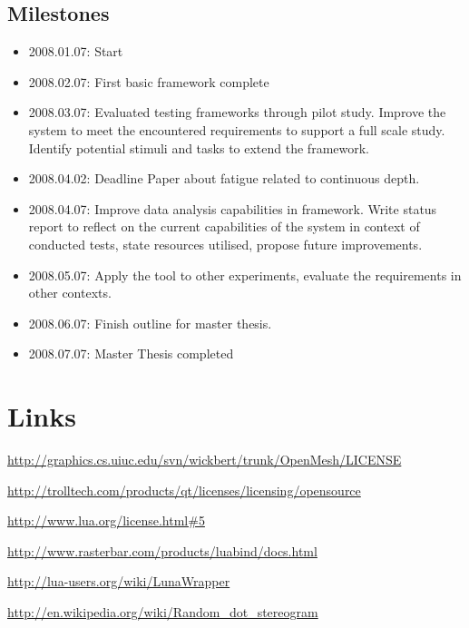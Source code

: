\documentclass[11pt]{scrartcl}
\begin{document}
\begin{multicols}{2}
\section{Milestones}
\begin{itemize}
\item 2008.01.07: Start
\item 2008.02.07: First basic framework complete
\item 2008.03.07: Evaluated testing frameworks through pilot study. Improve the system to meet the encountered requirements to support a full scale study. Identify potential stimuli and tasks to extend the framework.
\item 2008.04.02: Deadline Paper about fatigue related to continuous depth.
\item 2008.04.07: Improve data analysis capabilities in framework. Write status report to reflect on the current capabilities of the system in context of conducted tests, state resources utilised, propose future improvements.
\item 2008.05.07: Apply the tool to other experiments, evaluate the requirements in other contexts.
\item 2008.06.07: Finish outline for master thesis.
\item 2008.07.07: Master Thesis completed
\end{itemize}

\end{multicols}

\appendix

\section{Links}
\url{http://graphics.cs.uiuc.edu/svn/wickbert/trunk/OpenMesh/LICENSE}

\url{http://trolltech.com/products/qt/licenses/licensing/opensource}

\url{http://www.lua.org/license.html#5}

\url{http://www.rasterbar.com/products/luabind/docs.html}

\url{http://lua-users.org/wiki/LunaWrapper}

\url{http://en.wikipedia.org/wiki/Random_dot_stereogram}
\end{document}
